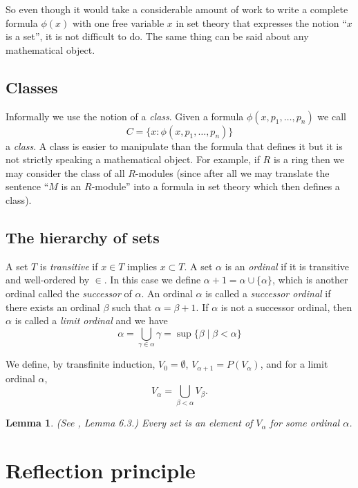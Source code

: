 \documentclass{amsart}
\newtheorem{lemma}[theorem]{Lemma}
\theoremstyle{definition}
\theoremstyle{remark}
\numberwithin{equation}{subsection}
\begin{document}
\medskip\noindent
So even though it would take a considerable amount of work to write
a complete formula $\phi(x)$ with one free variable $x$ in set theory 
that expresses the notion ``$x$ is a set'', it is not difficult to do.
The same thing can be said about any mathematical object.

\subsection{Classes}
\label{subsection-classes}

\noindent
Informally we use the notion of a {\it class}. Given a formula
$\phi(x,p_1,\ldots,p_n)$ we call
$$
C = \{x : \phi(x,p_1,\ldots,p_n)\}
$$
a {\it class}. A class is easier to manipulate than the formula
that defines it but it is not strictly speaking a mathematical
object. For example, if $R$ is a ring then we may
consider the class of all $R$-modules (since after all we
may translate the sentence ``$M$ is an $R$-module''
into a formula in set theory which then defines a class).


\subsection{The hierarchy of sets}
\label{subsection-sets-hierarchy}

\noindent
A set $T$ is {\it transitive} if $x\in T$ implies $x\subset T$.
A set $\alpha$ is an {\it ordinal} if it is transitive and well-ordered
by $\in$. In this case we define $\alpha + 1 = \alpha \cup \{\alpha\}$,
which is another ordinal called the {\it successor} of $\alpha$.
An ordinal $\alpha$ is called a {\it successor ordinal} if 
there exists an ordinal $\beta$ such that $\alpha = \beta + 1$.
If $\alpha$ is not a successor ordinal, then $\alpha$ is called
a {\it limit ordinal} and we have
$$
\alpha 
=
\bigcup_{\gamma \in \alpha} \gamma
=
\sup \{\beta \mid \beta < \alpha \}
$$

\medskip\noindent
We define, by transfinite induction, $V_0 = \emptyset$,
$V_{\alpha + 1} = P(V_\alpha)$, and for a limit ordinal $\alpha$,
$$
V_\alpha = \bigcup_{\beta < \alpha} V_\beta.
$$

\begin{lemma}
\label{axiom-regularity}
(See \cite{Jech}, Lemma 6.3.)
Every set is an element of $V_\alpha$ for some ordinal $\alpha$.
\end{lemma}

\section{Reflection principle}
\label{section-reflection-principle}
\end{document}
